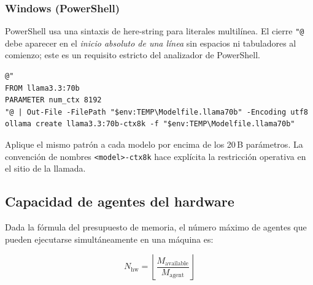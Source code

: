 \subsubsection{Windows (PowerShell)}

PowerShell usa una sintaxis de here-string para literales multilínea. El
cierre \texttt{"@} debe aparecer en el \emph{inicio absoluto de una línea}
sin espacios ni tabuladores al comienzo; este es un requisito estricto del
analizador de PowerShell.

\begin{lstlisting}[style=psstyle, caption={Crear una variante de modelo con contexto acotado en Windows}]
@"
FROM llama3.3:70b
PARAMETER num_ctx 8192
"@ | Out-File -FilePath "$env:TEMP\Modelfile.llama70b" -Encoding utf8
ollama create llama3.3:70b-ctx8k -f "$env:TEMP\Modelfile.llama70b"
\end{lstlisting}

Aplique el mismo patrón a cada modelo por encima de los 20\,B parámetros.
La convención de nombres \texttt{<model>-ctx8k} hace explícita la
restricción operativa en el sitio de la llamada.

\subsection{Capacidad de agentes del hardware}

Dada la fórmula del presupuesto de memoria, el número máximo de agentes
que pueden ejecutarse simultáneamente en una máquina es:

\begin{equation}
N_{\text{hw}} = \left\lfloor \frac{M_{\text{available}}}{M_{\text{agent}}} \right\rfloor
\label{eq:nhw}
\end{equation}

